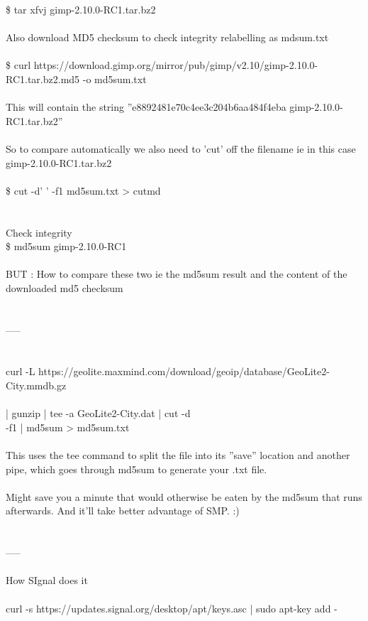 \documentclass[10pt,a4paper]{article}
\begin{document}
{{{{{{{{{{{{{	\$ tar xfvj gimp-2.10.0-RC1.tar.bz2\\
\\
Also download MD5 checksum to check integrity relabelling as mdsum.txt\\
\\
\$ curl https://download.gimp.org/mirror/pub/gimp/v2.10/gimp-2.10.0-RC1.tar.bz2.md5 -o md5sum.txt\\
\\
This will contain the string ''e8892481e70c4ee3c204b6aa484f4eba  gimp-2.10.0-RC1.tar.bz2''\\
\\
So to compare automatically we also need to 'cut' off the filename ie in this case gimp-2.10.0-RC1.tar.bz2\\
\\
\$ cut -d' ' -f1 md5sum.txt >  cutmd\\
\\
\\
Check integrity\\
\$ md5sum gimp-2.10.0-RC1\\
\\
BUT :  How to compare these two ie the md5sum result  and the content of the downloaded md5 checksum\\
\\
\\
-----\\
\\
\\
curl -L https://geolite.maxmind.com/download/geoip/database/GeoLite2-City.mmdb.gz \\\\
| gunzip | tee -a GeoLite2-City.dat | cut -d\\  -f1 | md5sum > md5sum.txt\\
\\
This uses the tee command to split the file into its ''save'' location and another pipe, which goes through md5sum to generate your .txt file.\\
\\
Might save you a minute that would otherwise be eaten by the md5sum that runs afterwards. And it'll take better advantage of SMP. :)\\
\\
\\
-----\\
\\
How SIgnal does it\\
\\
curl -s https://updates.signal.org/desktop/apt/keys.asc | sudo apt-key add -\\
}}}}}}}}}}}}}
\end{document}
